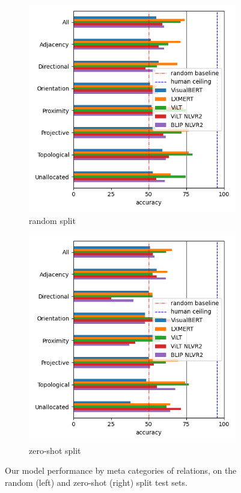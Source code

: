 \begin{figure}[ht]
    \centering
    \begin{subfigure}[b]{0.49\linewidth}
    \centering
    \includegraphics[width=\linewidth]{images/visual-spatial-reasoning/performance_rel_meta_cat_random.png}
    \caption{random split}
     \end{subfigure}
     \begin{subfigure}[b]{0.49\linewidth}
         \centering
    \includegraphics[width=\linewidth]{images/visual-spatial-reasoning/performance_rel_meta_cat_zeroshot.png}
         \caption{zero-shot split}
     \end{subfigure}
\caption{Our model performance by meta categories of relations, on the random (left) and zero-shot (right) split test sets.}
    \label{fig:performance_by_meta_cat}
\end{figure}

